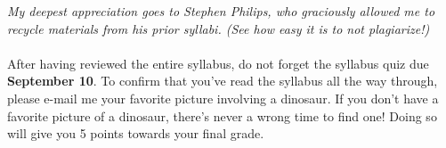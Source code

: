 \documentclass[11pt]{article}
\begin{document}
\vspace{2em}
\textit{My deepest appreciation goes to Stephen Philips, who graciously allowed me to recycle materials from his prior syllabi. (See how easy it is to not plagiarize!)}
\\\\
After having reviewed the entire syllabus, do not forget the syllabus quiz due \textbf{September 10}. To confirm that you’ve read the syllabus all the way through, please e-mail me your favorite picture involving a dinosaur. If you don’t have a favorite picture of a dinosaur, there’s never a wrong time to find one! Doing so will give you 5 points towards your final grade.
\end{document}
